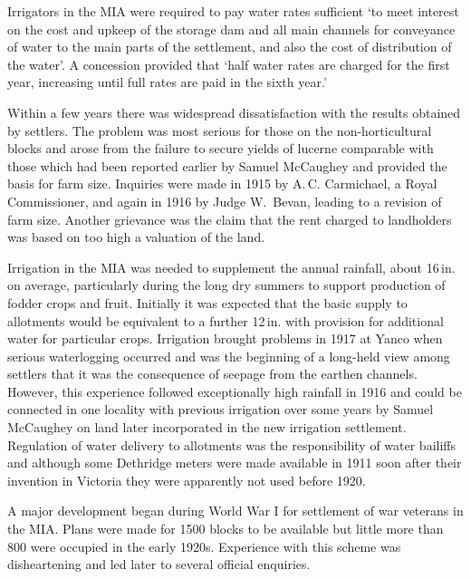 Irrigators in the MIA were required to pay water rates sufficient `to
meet interest on the cost and upkeep of the storage dam and all main
channels for conveyance of water to the main parts of the settlement,
and also the cost of distribution of the water'. A concession provided
that `half water rates are charged for the first year, increasing
until full rates are paid in the sixth year.'

Within a few years there was widespread dissatisfaction with the
results obtained by settlers.  The problem was most serious for those
on the non-horticultural blocks and arose from the failure to secure
yields of lucerne comparable with those which had been reported
earlier by Samuel McCaughey and provided the basis for farm size.
Inquiries were made in 1915 by A.\,C. Carmichael, a Royal
Commissioner, and again in 1916 by Judge W.~Bevan, leading to a
revision of farm size.  Another grievance was the claim that the rent
charged to landholders was based on too high a valuation of the
land.

Irrigation in the MIA was needed to supplement the annual rainfall,
about 16\,in. on average, particularly during the long dry summers to
support production of fodder crops and fruit.  Initially it was
expected that the basic supply to allotments would be equivalent to a
further 12\,in. with provision for additional water for particular
crops. Irrigation brought problems in 1917 at Yanco when serious
waterlogging occurred and was the beginning of a long-held view among
settlers that it was the consequence of seepage from the earthen
channels.  However, this experience followed exceptionally high
rainfall in 1916 and could be connected in one locality with previous
irrigation over some years by Samuel McCaughey on land later
incorporated in the new irrigation settlement.  Regulation of water
delivery to allotments was the responsibility of water bailiffs and
although some Dethridge meters were made available in 1911 soon after
their invention in Victoria they were apparently not used before
1920.

A major development began during World War I for settlement of war
veterans in the MIA.  Plans were made for 1500 blocks to be available
but little more than 800 were occupied in the early 1920s.  Experience
with this scheme was disheartening and led later to several official
enquiries.

